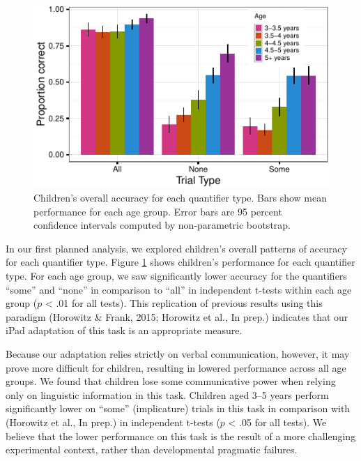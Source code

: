 \documentclass[10pt, letterpaper]{article}
\newenvironment{CodeChunk}{}{}
\begin{document}
\begin{CodeChunk}
\begin{figure}[h]
\includegraphics{figs/overall_acc-1} \caption[Children's overall accuracy for each quantifier type]{Children's overall accuracy for each quantifier type. Bars show mean performance for each age group. Error bars are 95 percent confidence intervals computed by non-parametric bootstrap.}\label{fig:overall_acc}
\end{figure}
\end{CodeChunk}

In our first planned analysis, we explored children's overall patterns
of accuracy for each quantifier type. Figure \ref{fig:overall_acc} shows
children's performance for each quantifier type. For each age group, we
saw significantly lower accuracy for the quantifiers ``some'' and
``none'' in comparison to ``all'' in independent t-tests within each age
group (\(p\) \textless{} .01 for all tests). This replication of
previous results using this paradigm (Horowitz \& Frank, 2015; Horowitz
et al., In prep.) indicates that our iPad adaptation of this task is an
appropriate measure.

Because our adaptation relies strictly on verbal communication, however,
it may prove more difficult for children, resulting in lowered
performance across all age groups. We found that children lose some
communicative power when relying only on linguistic information in this
task. Children aged 3--5 years perform significantly lower on ``some''
(implicature) trials in this task in comparison with (Horowitz et al.,
In prep.) in independent t-tests (\(p\) \textless{} .05 for all tests).
We believe that the lower performance on this task is the result of a
more challenging experimental context, rather than developmental
pragmatic failures.
\end{document}
